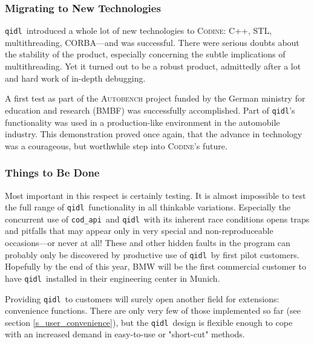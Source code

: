 \documentclass[a4paper, titlepage, twoside]{article}
\newcommand{\qidl}{{\tt qidl}}
\newcommand{\codapi}{{\tt cod\_api}}
\newcommand{\codine}{\textsc{Codine}}
\begin{document}
\subsubsection{Migrating to New Technologies}
\qidl\ introduced a whole lot of new technologies to \codine: C++, STL,
multithreading, CORBA---and was successful. There were serious doubts about
the stability of the product, especially concerning the subtle implications
of multithreading. Yet it turned out to be a robust product, admittedly after
a lot and hard work of in-depth debugging.

A first test as part of the \textsc{Autobench} project funded by the 
German ministry for education and research (BMBF) was successfully
accomplished. Part of \qidl's functionality was used in a production-like
environment in the automobile industry. This demonstration proved once again,
that the advance in technology was a courageous, but worthwhile step into
\codine's future.

\subsubsection{Things to Be Done}
Most important in this respect is certainly testing. It is almost impossible 
to test the full range of \qidl\
functionality in all thinkable variations. Especially the concurrent use of
\codapi\ and \qidl\ with its inherent race conditions opens traps and pitfalls
that may appear only in very special and non-reproduceable occasions---or
never at all! These and other hidden faults in the program can probably only
be discovered by productive use of \qidl\ by first pilot customers. Hopefully
by the end of this year, BMW will be the first commercial customer
to have \qidl\ installed in their engineering center in Munich.

Providing \qidl\ to customers will surely open another field for extensions:
convenience functions. There are only very few of those implemented so far
(see section \ref{s_user_convenience}), but the \qidl\ design is flexible
enough to cope with an increased demand in easy-to-use or "short-cut"
methods.
\end{document}

